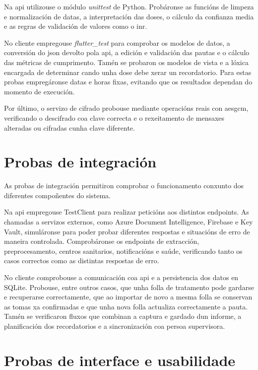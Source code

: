 Na \gls{api} utilizouse o módulo \textit{unittest} de Python. Probáronse as funcións de limpeza e normalización de datas, a interpretación das doses, o cálculo da confianza media e as regras de validación de valores como o \gls{inr}.

No cliente empregouse \textit{flutter\_test} para comprobar os modelos de datos, a conversión do \gls{json} devolto pola \gls{api}, a edición e validación das pautas e o cálculo das métricas de cumprimento. Tamén se probaron os modelos de vista e a lóxica encargada de determinar cando unha dose debe xerar un recordatorio. Para estas probas empregáronse datas e horas fixas, evitando que os resultados dependan do momento de execución.

Por último, o servizo de cifrado probouse mediante operacións reais con \gls{aesgcm}, verificando o descifrado coa clave correcta e o rexeitamento de mensaxes alteradas ou cifradas cunha clave diferente.

\section{Probas de integración}

As probas de integración permitiron comprobar o funcionamento conxunto dos diferentes compoñentes do sistema.

Na \gls{api} empregouse TestClient para realizar peticións aos distintos endpoints. As chamadas a servizos externos, como Azure Document Intelligence, Firebase e Key Vault, simuláronse para poder probar diferentes respostas e situacións de erro de maneira controlada. Comprobáronse os endpoints de extracción, preprocesamento, centros sanitarios, notificacións e saúde, verificando tanto os casos correctos como as distintas respostas de erro.

No cliente comprobouse a comunicación coa \gls{api} e a persistencia dos datos en SQLite. Probouse, entre outros casos, que unha folla de tratamento pode gardarse e recuperarse correctamente, que ao importar de novo a mesma folla se conservan as tomas xa confirmadas e que unha nova folla actualiza correctamente a pauta. Tamén se verificaron fluxos que combinan a captura e gardado dun informe, a planificación dos recordatorios e a sincronización coa persoa supervisora.

\section{Probas de interface e usabilidade}

